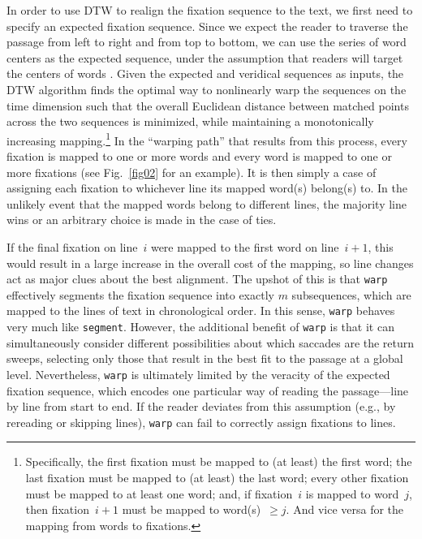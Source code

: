 \documentclass[doc,biblatex]{apa7}
\begin{document}
In order to use DTW to realign the fixation sequence to the text, we first need to specify an expected fixation sequence. Since we expect the reader to traverse the passage from left to right and from top to bottom, we can use the series of word centers as the expected sequence, under the assumption that readers will target the centers of words \parencite{ORegan:1984}. Given the expected and veridical sequences as inputs, the DTW algorithm finds the optimal way to nonlinearly warp the sequences on the time dimension such that the overall Euclidean distance between matched points across the two sequences is minimized, while maintaining a monotonically increasing mapping.\footnote{Specifically, the first fixation must be mapped to (at least) the first word; the last fixation must be mapped to (at least) the last word; every other fixation must be mapped to at least one word; and, if fixation~$i$ is mapped to word~$j$, then fixation~$i+1$ must be mapped to word(s)~$\ge j$. And vice versa for the mapping from words to fixations.} In the ``warping path'' that results from this process, every fixation is mapped to one or more words and every word is mapped to one or more fixations (see Fig.~\ref{fig02} for an example). It is then simply a case of assigning each fixation to whichever line its mapped word(s) belong(s) to. In the unlikely event that the mapped words belong to different lines, the majority line wins or an arbitrary choice is made in the case of ties.

If the final fixation on line~$i$ were mapped to the first word on line~$i+1$, this would result in a large increase in the overall cost of the mapping, so line changes act as major clues about the best alignment. The upshot of this is that \texttt{warp} effectively segments the fixation sequence into exactly $m$ subsequences, which are mapped to the lines of text in chronological order. In this sense, \texttt{warp} behaves very much like \texttt{segment}. However, the additional benefit of \texttt{warp} is that it can simultaneously consider different possibilities about which saccades are the return sweeps, selecting only those that result in the best fit to the passage at a global level. Nevertheless, \texttt{warp} is ultimately limited by the veracity of the expected fixation sequence, which encodes one particular way of reading the passage---line by line from start to end. If the reader deviates from this assumption (e.g., by rereading or skipping lines), \texttt{warp} can fail to correctly assign fixations to lines.
\end{document}
